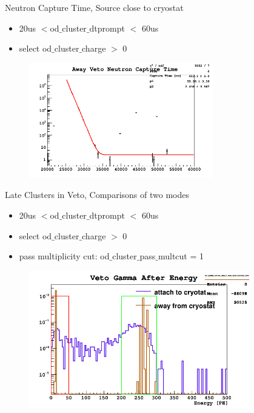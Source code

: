 \documentclass[9pt]{beamer}
\begin{document}
\begin{frame}{Neutron Capture Time, Source close to cryostat}
\begin{itemize}
[bullet]
\item 20us $<$od$\_$cluster$\_$dtprompt $<$ 60us
\item  select od$\_$cluster$\_$charge $>$ 0
\end{itemize}
\begin{figure}
\includegraphics[height= 5cm, width=.8\textwidth]{away_capture_time_Feb7PM.png}
\end{figure}
\end{frame}

\begin{frame}{Late Clusters in Veto, Comparisons of two modes}
\begin{itemize}
  [bullet]
\item 20us $<$od$\_$cluster$\_$dtprompt $<$ 60us
\item  select od$\_$cluster$\_$charge $>$ 0
\item pass multiplicity cut: od$\_$cluster$\_$pass$\_$multcut = 1    
 \end{itemize} 
\begin{figure}
\includegraphics[height= 6cm, width=.8\textwidth]{after_ene_Feb7PM.png}
\end{figure}
\end{frame}
\end{document}
